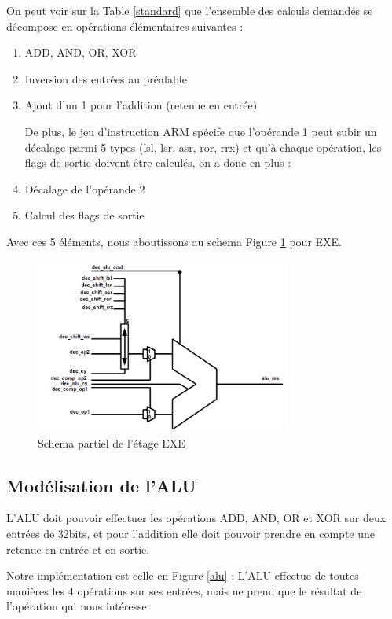\documentclass{article}
\begin{document}
On peut voir sur la Table \ref{standard} que l'ensemble des calculs demandés se décompose
en opérations élémentaires suivantes :
\begin{enumerate}
  \item ADD, AND, OR, XOR
  \item Inversion des entrées au préalable
  \item Ajout d'un 1 pour l'addition (retenue en entrée)

De plus, le jeu d'instruction ARM spécife que l'opérande 1 peut subir un décalage
parmi 5 types (lsl, lsr, asr, ror, rrx) et qu'à chaque opération, les flags de sortie
doivent être calculés, on a donc en plus :
  \item Décalage de l'opérande 2
  \item Calcul des flags de sortie
\end{enumerate}

Avec ces 5 éléments, nous aboutissons au schema Figure \ref{exe_part} pour EXE.

\begin{figure}[H]
\includegraphics[width=0.75\textwidth]{pics/exe_part.png}
\centering
\caption{Schema partiel de l'étage EXE}
\label{exe_part}
\end{figure}

\subsection{Modélisation de l'ALU}

L'ALU doit pouvoir effectuer les opérations ADD, AND, OR et XOR sur deux entrées de 32bits,
et pour l'addition elle doit pouvoir prendre en compte une retenue en entrée et en sortie.

Notre implémentation est celle en Figure \ref{alu} : L'ALU effectue de toutes manières les
4 opérations sur ses entrées, mais ne prend que le résultat de l'opération qui nous intéresse.
\end{document}
